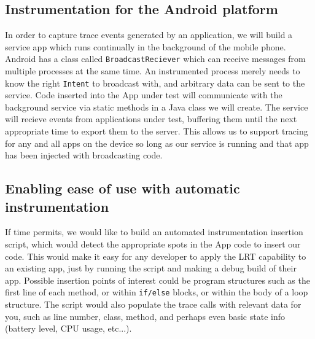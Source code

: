 \documentclass{acm_proc_article-sp}
\begin{document}
\subsection{Instrumentation for the Android platform}
In order to capture trace events generated by an application, we will build
a service app which runs continually in the background of the mobile phone.
Android has a class called \texttt{BroadcastReciever} which can receive messages
from multiple processes at the same time. An instrumented process merely needs
to know the right \texttt{Intent} to broadcast with, and arbitrary data can be
sent to the service. Code inserted into the App under test will communicate with the
background service via static methods in a Java class we will create.
The service will recieve events from applications under test, buffering them until the
next appropriate time to export them to the server. This allows us to support 
tracing for any and all apps on the device so long as our service is running and 
that app has been injected with broadcasting code.

\subsection{Enabling ease of use with automatic instrumentation}
If time permits, we would like to build an automated instrumentation insertion 
script, which would detect the appropriate spots in the App code to insert our 
code. This would make it easy for any developer to apply the LRT capability to
an existing app, just by running the script and making a debug build of their 
app. Possible insertion points of interest could be program structures such as the first
line of each method, or within \texttt{if/else} blocks, or within the body of
a loop structure. The script would also populate the trace calls with relevant data
for you, such as line number, class, method, and perhaps even basic state info (battery
level, CPU usage, etc...).




{}

\end{document}
